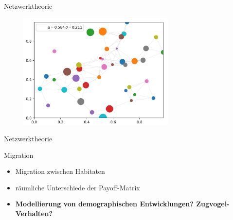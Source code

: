 \documentclass{beamer}
\begin{document}
\begin{frame}{Netzwerktheorie}
    \begin{figure}
        \centering
        \includegraphics[width=0.7\textwidth]{Figs/Screenshot.png}
        \label{fig:my_label}
    \end{figure}
\end{frame}

\begin{frame}{Netzwerktheorie}
    \begin{block}{Migration}
    \begin{itemize}
        \item Migration zwischen Habitaten
        \item räumliche Unterschiede der Payoff-Matrix
        \item \textbf{Modellierung von demographischen Entwicklungen? Zugvogel-Verhalten?}
    \end{itemize}
    
    \end{block}
\end{frame}




\end{document}
